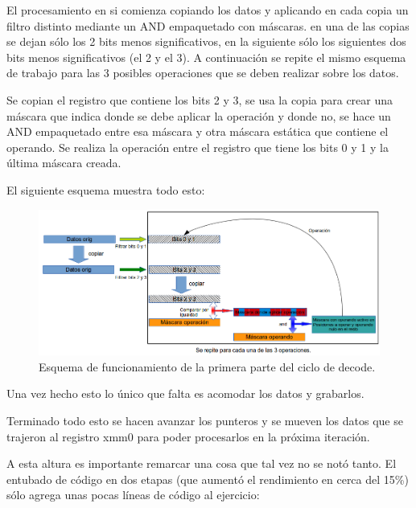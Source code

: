 	El procesamiento en si comienza copiando los datos y aplicando
en cada copia un filtro distinto mediante un AND empaquetado con máscaras.
en una de las copias se dejan sólo los 2 bits menos significativos, en la siguiente
sólo los siguientes dos bits menos significativos (el 2 y el 3). A continuación
se repite el mismo esquema de trabajo para las 3 posibles operaciones
que se deben realizar sobre los datos.

	Se copian el registro que contiene los bits 2 y 3, se usa la copia para crear
una máscara que indica donde se debe aplicar la operación y donde no, se
hace un AND empaquetado entre esa máscara y otra máscara estática que contiene
el operando. Se realiza la operación entre el registro que tiene los bits
0 y 1 y la última máscara creada.

	El siguiente esquema muestra todo esto:

\begin{figure}[h]
\begin{center}
  \includegraphics[scale=0.6]{secciones/decodificacion/imagenes/esquemaCicloDecode.png}
\end{center}
\caption{Esquema de funcionamiento de la primera parte del ciclo de decode.}
\label{fig:ciclo-decode}
\end{figure}


	Una vez hecho esto lo único que falta es acomodar los datos y grabarlos.

	Terminado todo esto se hacen avanzar los punteros y se mueven los datos que se
trajeron al registro xmm0 para poder procesarlos en la próxima iteración.

	A esta altura es importante remarcar una cosa que tal vez no se notó tanto.
El entubado de código en dos etapas (que aumentó el rendimiento en cerca del 15\%)
sólo agrega unas pocas líneas de código al ejercicio:


